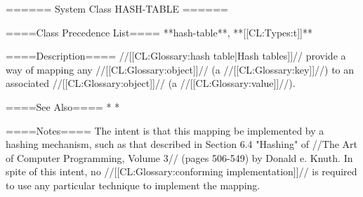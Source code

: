 ====== System Class HASH-TABLE ======

====Class Precedence List====
**hash-table**, **[[CL:Types:t]]**

====Description====
//[[CL:Glossary:hash table|Hash tables]]// provide a way of mapping any //[[CL:Glossary:object]]// (a //[[CL:Glossary:key]]//) to an associated //[[CL:Glossary:object]]// (a //[[CL:Glossary:value]]//).

====See Also====
  * {\secref\HashTableConcepts}
  * {\secref\PrintingOtherObjects}

====Notes====
The intent is that this mapping be implemented by a hashing mechanism, such as that described in Section 6.4 "Hashing" of //The Art of Computer Programming, Volume 3// (pages 506-549) by Donald e. Knuth. In spite of this intent, no //[[CL:Glossary:conforming implementation]]// is required to use any particular technique to implement the mapping.

